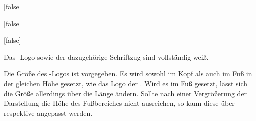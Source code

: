 \documentclass[english,ngerman,ToDo=no,fontspec=no]{tudscrman3}
\begin{document}
\begin{Declaration}{}[false]
\begin{Declaration}[v2.02]{}[false]
\begin{Declaration}{}[false]
\begin{values}{}
  Das \DDC-Logo sowie der dazugehörige Schriftzug sind vollständig weiß.
\end{values}
%
Die Größe des \DDC-Logos ist vorgegeben. Es wird sowohl im Kopf als auch im Fuß 
in der gleichen Höhe gesetzt, wie das Logo der \TnUD. Wird es im Fuß gesetzt, 
lässt sich die Größe allerdings über die Länge  ändern. 
Sollte nach einer Vergrößerung der Darstellung die Höhe des Fußbereiches nicht 
ausreichen, so kann diese über  
respektive  angepasst werden.
\end{Declaration}
\end{Declaration}
\end{Declaration}

\clearpage
\makeatletter
\@printindex[options]
\@printindex[macros]
\end{document}
